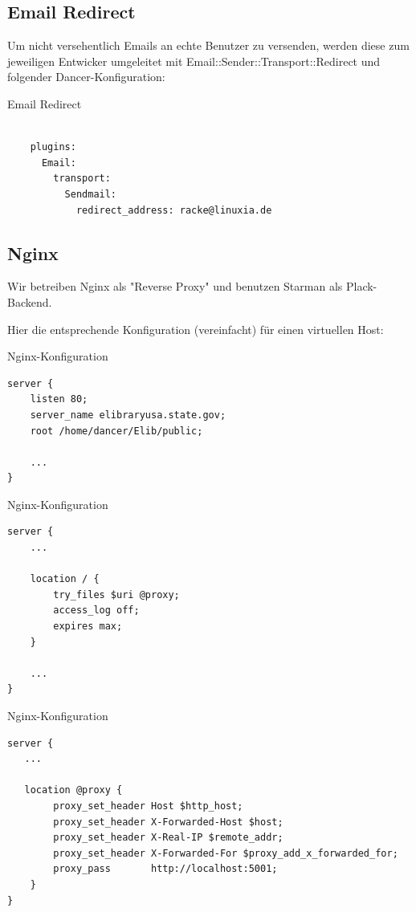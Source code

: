 \subsection{Email Redirect}

Um nicht versehentlich Emails an echte Benutzer zu versenden,
werden diese zum jeweiligen Entwicker umgeleitet mit
Email::Sender::Transport::Redirect und folgender
Dancer-Konfiguration:

\begin{frame}[fragile]{Email Redirect}
\begin{lstlisting}

    plugins:
      Email:
        transport:
          Sendmail:
            redirect_address: racke@linuxia.de

\end{lstlisting}
\end{frame}

\subsection{Nginx}
    
Wir betreiben Nginx als "Reverse Proxy" und benutzen Starman als
Plack-Backend.

Hier die entsprechende Konfiguration (vereinfacht) für einen virtuellen
Host:

\begin{frame}[fragile]{Nginx-Konfiguration}
\begin{lstlisting}
server {
    listen 80;
    server_name elibraryusa.state.gov;
    root /home/dancer/Elib/public;

    ...
}
\end{lstlisting}
\end{frame}

\begin{frame}[fragile]{Nginx-Konfiguration}
\begin{lstlisting}
server {
    ...

    location / {
        try_files $uri @proxy;
        access_log off;
        expires max;
    }

    ...
}
\end{lstlisting}
\end{frame}

\begin{frame}[fragile]{Nginx-Konfiguration}
\begin{lstlisting}
server {
   ...

   location @proxy {
        proxy_set_header Host $http_host;
        proxy_set_header X-Forwarded-Host $host;
        proxy_set_header X-Real-IP $remote_addr;
        proxy_set_header X-Forwarded-For $proxy_add_x_forwarded_for;
        proxy_pass       http://localhost:5001;
    }
}
\end{lstlisting}
\end{frame}

